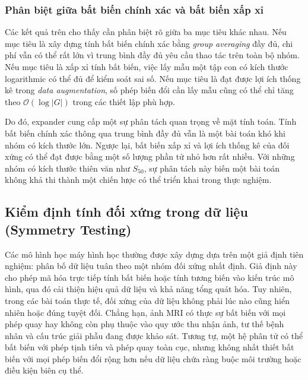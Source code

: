 \subsubsection{Phân biệt giữa bất biến chính xác và bất biến xấp xỉ}

Các kết quả trên cho thấy cần phân biệt rõ giữa ba mục tiêu khác nhau. Nếu mục tiêu là xây dựng tính bất biến chính xác bằng \textit{group averaging} đầy đủ, chi phí vẫn có thể rất lớn vì trung bình đầy đủ yêu cầu thao tác trên toàn bộ nhóm. Nếu mục tiêu là xấp xỉ tính bất biến, việc lấy mẫu một tập con có kích thước logarithmic có thể đủ để kiểm soát sai số. Nếu mục tiêu là đạt được lợi ích thống kê trong \textit{data augmentation}, số phép biến đổi cần lấy mẫu cũng có thể chỉ tăng theo $\mathcal{O}(\log |G|)$ trong các thiết lập phù hợp.

Do đó, expander cung cấp một sự phân tách quan trọng về mặt tính toán. Tính bất biến chính xác thông qua trung bình đầy đủ vẫn là một bài toán khó khi nhóm có kích thước lớn. Ngược lại, bất biến xấp xỉ và lợi ích thống kê của đối xứng có thể đạt được bằng một số lượng phần tử nhỏ hơn rất nhiều. Với những nhóm có kích thước thiên văn như $S_{50}$, sự phân tách này biến một bài toán không khả thi thành một chiến lược có thể triển khai trong thực nghiệm.

\subsection{Kiểm định tính đối xứng trong dữ liệu (Symmetry Testing)}
\label{subsec:symmetry-testing}

Các mô hình học máy hình học thường được xây dựng dựa trên một giả định tiên nghiệm: phân bố dữ liệu tuân theo một nhóm đối xứng nhất định. Giả định này cho phép mã hóa trực tiếp tính bất biến hoặc tính tương biến vào kiến trúc mô hình, qua đó cải thiện hiệu quả dữ liệu và khả năng tổng quát hóa. Tuy nhiên, trong các bài toán thực tế, đối xứng của dữ liệu không phải lúc nào cũng hiển nhiên hoặc đúng tuyệt đối. Chẳng hạn, ảnh MRI có thực sự bất biến với mọi phép quay hay không còn phụ thuộc vào quy ước thu nhận ảnh, tư thế bệnh nhân và cấu trúc giải phẫu đang được khảo sát. Tương tự, một hệ phân tử có thể bất biến với phép tịnh tiến và phép quay toàn cục, nhưng không nhất thiết bất biến với mọi phép biến đổi rộng hơn nếu dữ liệu chứa ràng buộc môi trường hoặc điều kiện biên cụ thể.

